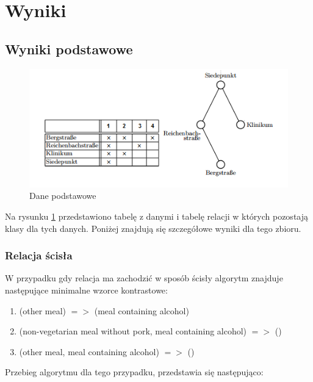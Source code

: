 \documentclass[a4paper,12pt]{article}
\begin{document}
\section{Wyniki}

\subsection{Wyniki podstawowe}

\begin{figure}[h!]
\begin{center}
\includegraphics[width=\textwidth]{img/dane.png}
\caption{Dane podstawowe}
\label{dane_podstawowe}
\end{center}
\end{figure}

Na rysunku \ref{dane_podstawowe} przedstawiono tabelę z danymi i tabelę relacji w których pozostają klasy dla tych danych. Poniżej znajdują się szczegółowe wyniki dla tego zbioru.

\subsubsection{Relacja ścisła}

W przypadku gdy relacja ma zachodzić w sposób ścisły algorytm znajduje następujące minimalne wzorce kontrastowe:

\begin{enumerate}
\item (other meal) $=>$ (meal containing alcohol)
\item (non-vegetarian meal without pork, meal containing alcohol) $=>$ ()
\item (other meal, meal containing alcohol) $=>$ ()
\end{enumerate}

Przebieg algorytmu dla tego przypadku, przedstawia się następująco:\\
\end{document}
